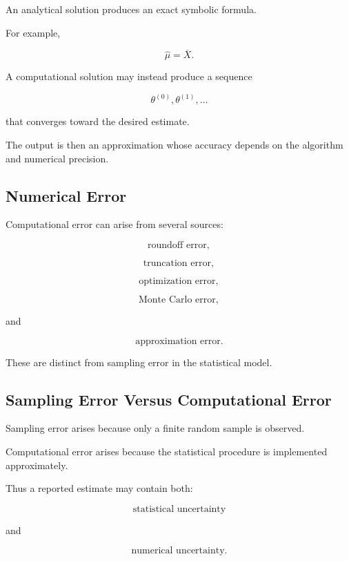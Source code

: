 An analytical solution produces an exact symbolic formula.

For example,

\[
\boxed{
\widehat{\mu}
=
\overline{X}.
}
\]

A computational solution may instead produce a sequence

\[
\boxed{
\theta^{(0)},
\theta^{(1)},
\ldots
}
\]

that converges toward the desired estimate.

The output is then an approximation whose accuracy depends on the
algorithm and numerical precision.

\subsection{Numerical Error}
\label{subsec:numerical-error-statistics}

Computational error can arise from several sources:

\[
\boxed{
\text{roundoff error},
}
\]

\[
\boxed{
\text{truncation error},
}
\]

\[
\boxed{
\text{optimization error},
}
\]

\[
\boxed{
\text{Monte Carlo error},
}
\]

and

\[
\boxed{
\text{approximation error}.
}
\]

These are distinct from sampling error in the statistical model.

\subsection{Sampling Error Versus Computational Error}
\label{subsec:sampling-versus-computational-error}

Sampling error arises because only a finite random sample is observed.

Computational error arises because the statistical procedure is
implemented approximately.

Thus a reported estimate may contain both:

\[
\boxed{
\text{statistical uncertainty}
}
\]

and

\[
\boxed{
\text{numerical uncertainty}.
}
\]

